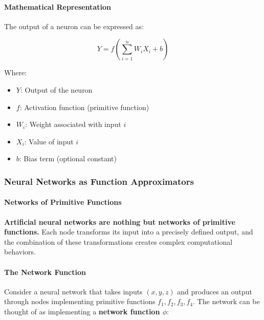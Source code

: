\paragraph{Mathematical Representation}
\label{para:mathematical-representation-neuron}

The output of a neuron can be expressed as:

\begin{equation}
\label{eq:neuron-general}
Y = f\left(\sum_{i=1}^{n} W_i X_i + b\right)
\end{equation}

Where:

\begin{itemize}
\item $Y$: Output of the neuron
\item $f$: Activation function (primitive function)
\item $W_i$: Weight associated with input $i$
\item $X_i$: Value of input $i$
\item $b$: Bias term (optional constant)
\end{itemize}

\subsubsection{Neural Networks as Function Approximators}
\label{subsubsec:nn-function-approximators}

\paragraph{Networks of Primitive Functions}
\label{para:networks-primitive-functions}

\textbf{Artificial neural networks are nothing but networks of primitive functions.} Each node transforms its input into a precisely defined output, and the combination of these transformations creates complex computational behaviors.

\paragraph{The Network Function}
\label{para:network-function}

Consider a neural network that takes inputs $(x, y, z)$ and produces an output through nodes implementing primitive functions $f_1, f_2, f_3, f_4$. The network can be thought of as implementing a \textbf{network function $\phi$}:

